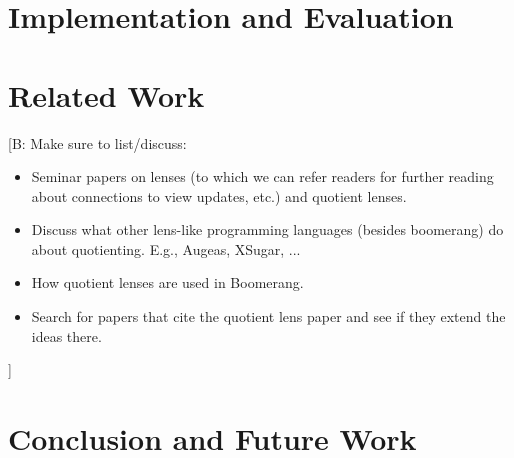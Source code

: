 \documentclass{svproc}
\newcommand{\FINISH}[3]{\ifdraft\textcolor{#1}{[#2: #3]}\fi}
\newcommand{\bcp}[1]{\FINISH{dkred}{B}{#1}}
\begin{document}
\section{Implementation and Evaluation}
\label{impl}

\section{Related Work}
\label{relwork}

\bcp{Make sure to list/discuss:
  \begin{itemize}
  \item Seminar papers on lenses (to which we can refer readers for further
  reading about connections to view updates, etc.) and quotient lenses.
  \item Discuss what other lens-like programming languages (besides
  boomerang) do about quotienting.  E.g., Augeas, XSugar, ...
  \item How quotient lenses are used in Boomerang.
  \item Search for papers that cite the quotient lens paper and see if they
  extend the ideas there.
  \end{itemize}
}

\section{Conclusion and Future Work}
\label{concl}
\end{document}
